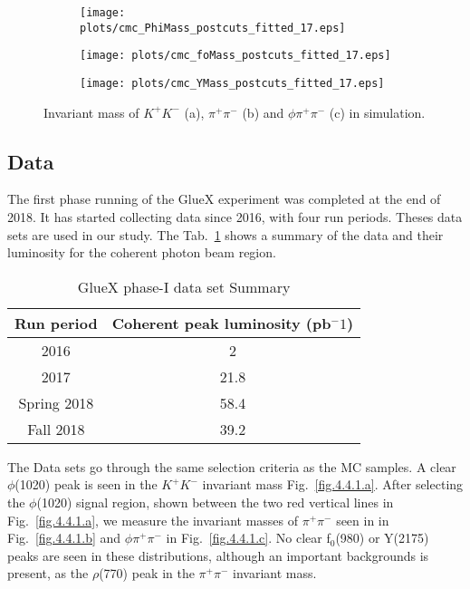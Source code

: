 \begin{figure}[H]
    \centering
    \begin{subfigure}[b]{0.45\textwidth}
        \texttt{[image: plots/cmc\_PhiMass\_postcuts\_fitted\_17.eps]}
        \caption{}
        \label{fig.4.3.1.a}
    \end{subfigure}
    \begin{subfigure}[b]{0.45\textwidth}
        \texttt{[image: plots/cmc\_foMass\_postcuts\_fitted\_17.eps]}
        \caption{}
        \label{fig.4.3.1.b}
    \end{subfigure}
    \begin{subfigure}[b]{0.45\textwidth}
        \texttt{[image: plots/cmc\_YMass\_postcuts\_fitted\_17.eps]}
        \caption{}
        \label{fig.4.3.1.c}
    \end{subfigure}
    \caption{Invariant mass of $K^+ K^-$ (a), $\pi^+ \pi^-$ (b) and $\phi \pi^+ \pi^-$ (c) in simulation.}
    \label{fig.4.3.1}
\end{figure}

\subsection{Data}
\label{p.4.4}

The first phase running of the GlueX experiment was completed at the end of 2018. It has started collecting data since 2016,  with four run periods. Theses data sets are used in our study. The Tab.~\ref{tab.4.4} shows a summary of the data and their luminosity for the coherent photon beam region.

\begin{table}[H]
    \centering
    \caption{GlueX phase-I data set Summary}
    \label{tab.4.4}
    \begin{tabular}{|c|c|}
        \hline
        Run period & Coherent peak luminosity (pb$^-1$)\\
        \hline
        2016 & 2 \\
        \hline
        2017 & 21.8 \\
        \hline
        Spring 2018 & 58.4 \\
        \hline
        Fall 2018 & 39.2 \\
        \hline
    \end{tabular}
\end{table}

The Data sets go through the same selection criteria as the MC samples. A clear $\phi$(1020) peak is seen in the $K^+K^-$ invariant mass Fig.~\ref{fig.4.4.1.a}. After selecting the $\phi$(1020) signal region, shown between the two red vertical lines in Fig.~\ref{fig.4.4.1.a}, we measure the invariant masses of $\pi^+ \pi^-$ seen in in Fig.~\ref{fig.4.4.1.b} and $\phi \pi^+ \pi^-$ in Fig.~\ref{fig.4.4.1.c}. No clear f$_0$(980) or Y(2175) peaks are seen in these distributions, although an important backgrounds is present, as the $\rho$(770) peak in the $\pi^+ \pi^-$ invariant mass.

